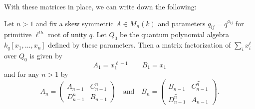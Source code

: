 \documentclass [11pt, proquest] {uwthesis}[2020/02/24]
\begin{document}
    With these matrices in place, we can write down the following:
    \begin{thm}\label{thm:factorization}
        Let $n>1$ and fix a skew symmetric $A\in M_n(k)$ and parameters $q_{ij}=q^{a_{ij}}$ for primitive $\ell^{th}$ root of unity $q.$ Let $Q_0$ be the quantum polynomial algebra $k_q[x_1,\dots,x_n]$ defined by these parameters. Then a matrix factorization of $\sum_i x_i^\ell$ over $Q_0$ is given by
        \[A_1= x_1^{\ell-1}\qquad B_1=x_1\]
        and for any $n>1$ by
        \[A_n=\begin{pmatrix}A_{n-1} & C_{n-1}^n\\D_{n-1}^n& B_{n-1}\end{pmatrix}\quad\text{and}\quad B_n=\begin{pmatrix}B_{n-1}&\widetilde{C_{n-1}^n}\\ \widetilde{D_{n-1}^n} & A_{n-1}\end{pmatrix}.\]
    \end{thm}
\end{document}
